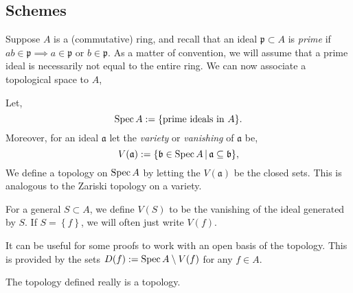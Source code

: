 \documentclass[000-main.tex]{subfiles}
\begin{document}
\subsection{Schemes}%
\label{sec:schemes}

Suppose $A$ is a (commutative) ring, and recall that an ideal $\mathfrak{p}\subset A$ is \emph{prime} if $ab\in\mathfrak{p}\implies a\in \mathfrak{p}$ or $b\in\mathfrak{p}$.
As a matter of convention, we will assume that a prime ideal is necessarily not equal to the entire ring.
We can now associate a topological space to $A$,
\begin{definition}
  Let,
  \[
	\operatorname{Spec} A := \lbrace\text{prime ideals in }A\rbrace.
  \]
  Moreover, for an ideal $\mathfrak{a}$ let the \emph{variety} or \emph{vanishing} of $\mathfrak{a}$ be,
  \[
	V(\mathfrak{a}) := \lbrace\mathfrak{b} \in \operatorname{Spec} A \, | \, \mathfrak{a} \subseteq \mathfrak{b} \rbrace,
  \]
  We define a topology on $\operatorname{Spec} A$ by letting the $V(\mathfrak{a})$ be the closed sets.
  This is analogous to the Zariski topology on a variety.
\end{definition}
For a general $S\subset A$, we define $V(S)$ to be the vanishing of the ideal generated by $S$.
If $S = \left\{ f \right\}$, we will often just write $V(f)$.

\begin{remark}
  It can be useful for some proofs to work with an open basis of the topology.
  This is provided by the sets $D(f) := \operatorname{Spec} A\setminus V(f)$ for any $f \in A$.
\end{remark}

\begin{lemma}
  The topology defined really is a topology.
\end{lemma} 
\end{document}
